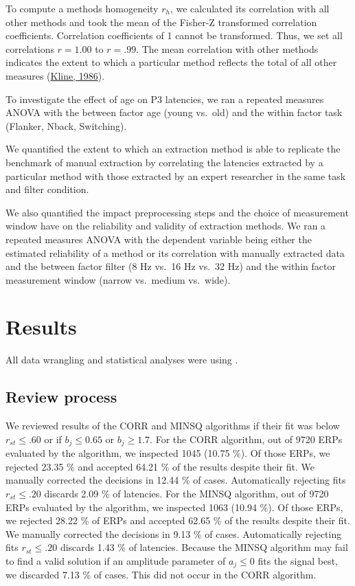 \documentclass[
  man]{apa7}
\begin{document}
To compute a methods homogeneity \(r_h\), we calculated its correlation with all other methods and took the mean of the Fisher-Z transformed correlation coefficients. Correlation coefficients of 1 cannot be transformed. Thus, we set all correlations \(r = 1.00\) to \(r = .99\). The mean correlation with other methods indicates the extent to which a particular method reflects the total of all other measures (\protect\hyperlink{ref-kline1986handbook}{Kline, 1986}).

To investigate the effect of age on P3 latencies, we ran a repeated measures ANOVA with the between factor age (young vs.~old) and the within factor task (Flanker, Nback, Switching).

We quantified the extent to which an extraction method is able to replicate the benchmark of manual extraction by correlating the latencies extracted by a particular method with those extracted by an expert researcher in the same task and filter condition.

We also quantified the impact preprocessing steps and the choice of measurement window have on the reliability and validity of extraction methods. We ran a repeated measures ANOVA with the dependent variable being either the estimated reliability of a method or its correlation with manually extracted data and the between factor filter (8 Hz vs.~16 Hz vs.~32 Hz) and the within factor measurement window (narrow vs.~medium vs.~wide).

\hypertarget{results}{%
\section{Results}\label{results}}

All data wrangling and statistical analyses were using .

\hypertarget{review-process}{%
\subsection{Review process}\label{review-process}}

We reviewed results of the CORR and MINSQ algorithms if their fit was below \(r_{st} \le .60\) or if \(b_j \le 0.65\) or \(b_j \ge 1.7\). For the CORR algorithm, out of 9720 ERPs evaluated by the algorithm, we inspected 1045 (10.75 \%). Of those ERPs, we rejected 23.35 \% and accepted 64.21 \% of the results despite their fit. We manually corrected the decisions in 12.44 \% of cases. Automatically rejecting fits \(r_{st} \le .20\) discards 2.09 \% of latencies. For the MINSQ algorithm, out of 9720 ERPs evaluated by the algorithm, we inspected 1063 (10.94 \%). Of those ERPs, we rejected 28.22 \% of ERPs and accepted 62.65 \% of the results despite their fit. We manually corrected the decisions in 9.13 \% of cases. Automatically rejecting fits \(r_{st} \le .20\) discards 1.43 \% of latencies. Because the MINSQ algorithm may fail to find a valid solution if an amplitude parameter of \(a_j \le 0\) fits the signal best, we discarded 7.13 \% of cases. This did not occur in the CORR algorithm.
\end{document}
